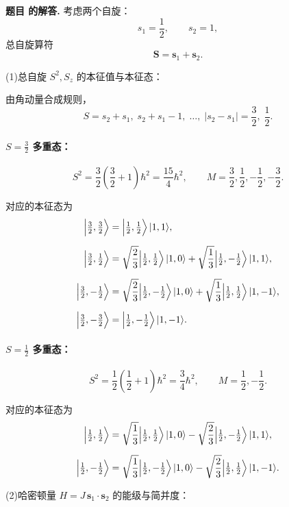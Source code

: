 \documentclass[12pt, a4paper, oneside]{ctexart}
\newcounter{problemname}
\newenvironment{solution}
  {\par\noindent\textbf{题目 \theproblemname 的解答. }}
  {\par}
\begin{document}
\begin{solution}
考虑两个自旋：
\[
s_1=\frac12,\qquad s_2=1,
\]
总自旋算符
\[
\boldsymbol{S}=\boldsymbol{s}_1+\boldsymbol{s}_2.
\]

\medskip
\noindent
(1)\;总自旋 $S^2,S_z$ 的本征值与本征态：

由角动量合成规则，
\[
S = s_2+s_1,\; s_2+s_1-1,\;\dots,\;|s_2-s_1|
= \frac32,\;\frac12.
\]

\paragraph{$S=\frac32$ 多重态：}
\[
S^2=\frac32\left(\frac32+1\right)\hbar^2=\frac{15}{4}\hbar^2,
\qquad
M=\frac32,\frac12,-\frac12,-\frac32.
\]

对应的本征态为
\[
\begin{aligned}
\Bigl|\tfrac32,\tfrac32\Bigr\rangle
&=\Bigl|\tfrac12,\tfrac12\Bigr\rangle\,|1,1\rangle,\\[6pt]
\Bigl|\tfrac32,\tfrac12\Bigr\rangle
&=\sqrt{\frac{2}{3}}
\Bigl|\tfrac12,\tfrac12\Bigr\rangle\,|1,0\rangle
+\sqrt{\frac{1}{3}}
\Bigl|\tfrac12,-\tfrac12\Bigr\rangle\,|1,1\rangle,\\[6pt]
\Bigl|\tfrac32,-\tfrac12\Bigr\rangle
&=\sqrt{\frac{2}{3}}
\Bigl|\tfrac12,-\tfrac12\Bigr\rangle\,|1,0\rangle
+\sqrt{\frac{1}{3}}
\Bigl|\tfrac12,\tfrac12\Bigr\rangle\,|1,-1\rangle,\\[6pt]
\Bigl|\tfrac32,-\tfrac32\Bigr\rangle
&=\Bigl|\tfrac12,-\tfrac12\Bigr\rangle\,|1,-1\rangle.
\end{aligned}
\]

\paragraph{$S=\frac12$ 多重态：}
\[
S^2=\frac12\left(\frac12+1\right)\hbar^2=\frac34\hbar^2,
\qquad
M=\frac12,-\frac12.
\]

对应的本征态为
\[
\begin{aligned}
\Bigl|\tfrac12,\tfrac12\Bigr\rangle
&=\sqrt{\frac{1}{3}}
\Bigl|\tfrac12,\tfrac12\Bigr\rangle\,|1,0\rangle
-\sqrt{\frac{2}{3}}
\Bigl|\tfrac12,-\tfrac12\Bigr\rangle\,|1,1\rangle,\\[6pt]
\Bigl|\tfrac12,-\tfrac12\Bigr\rangle
&=\sqrt{\frac{1}{3}}
\Bigl|\tfrac12,-\tfrac12\Bigr\rangle\,|1,0\rangle
-\sqrt{\frac{2}{3}}
\Bigl|\tfrac12,\tfrac12\Bigr\rangle\,|1,-1\rangle.
\end{aligned}
\]

\medskip
\noindent
(2)\;哈密顿量 $H=J\,\boldsymbol{s}_1\cdot\boldsymbol{s}_2$ 的能级与简并度：


\end{solution}
\end{document}
